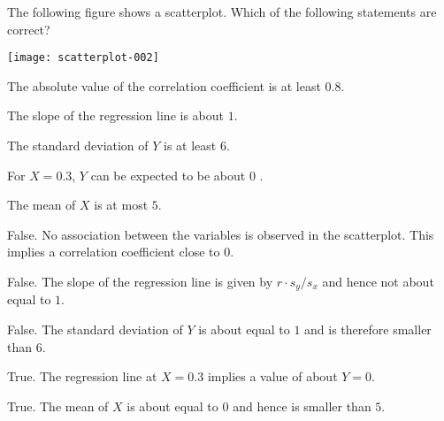 
\begin{question}
The following figure shows a scatterplot. Which of the
following statements are correct?

\texttt{[image: scatterplot-002]}

\begin{answerlist}
  \item The absolute value of the correlation coefficient is at least $0.8$.
  \item The slope of the regression line is about $1$.
  \item The standard deviation of $Y$ is at least $6$.
  \item For $X =  0.3 $, $Y$ can be expected to be about  0 .
  \item The mean of $X$ is at most $5$.
\end{answerlist}
\end{question}

\begin{solution}
\begin{answerlist}
  \item False. No association between the variables is observed in the scatterplot. This implies a correlation coefficient close to $0$.
  \item False. The slope of the regression line is given by $r \cdot s_y/s_x$ and hence not about equal to $1$.
  \item False. The standard deviation of $Y$ is about equal to $ 1 $ and is therefore smaller than $6$.
  \item True. The regression line at $X=0.3$ implies a value of about $Y = 0$.
  \item True. The mean of $X$ is about equal to $ 0 $ and hence is smaller than $5$.
\end{answerlist}
\end{solution}



